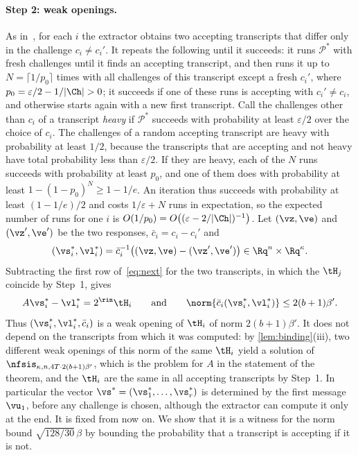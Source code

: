 \paragraph{Step 2: weak openings.}
As in~\cite{BS23,NS22}, for each $i$ the extractor obtains two accepting transcripts that differ only in the challenge $c_i\ne c_i'$. It repeats the following until it succeeds: it runs $\mathcal P^*$ with fresh challenges until it finds an accepting transcript, and then runs it up to $N=\lceil1/p_0\rceil$ times with all challenges of this transcript except a fresh $c_i'$, where $p_0=\varepsilon/2-1/\lvert\Ch\rvert>0$; it succeeds if one of these runs is accepting with $c_i'\ne c_i$, and otherwise starts again with a new first transcript. Call the challenges other than $c_i$ of a transcript \emph{heavy} if $\mathcal P^*$ succeeds with probability at least $\varepsilon/2$ over the choice of $c_i$. The challenges of a random accepting transcript are heavy with probability at least $1/2$, because the transcripts that are accepting and not heavy have total probability less than $\varepsilon/2$. If they are heavy, each of the $N$ runs succeeds with probability at least $p_0$, and one of them does with probability at least $1-(1-p_0)^N\ge1-1/e$. An iteration thus succeeds with probability at least $(1-1/e)/2$ and costs $1/\varepsilon+N$ runs in expectation, so the expected number of runs for one $i$ is $O(1/p_0)=O\bigl((\varepsilon-2/\lvert\Ch\rvert)^{-1}\bigr)$. Let $(\vz,\ve)$ and $(\vz',\ve')$ be the two responses, $\bar c_i=c_i-c_i'$ and
\[
(\vs^*_i,\vl^*_i)=\bar c_i^{-1}\bigl((\vz,\ve)-(\vz',\ve')\bigr)\in\Rq^n\times\Rq^\kappa .
\]
Subtracting the first row of~\eqref{eq:next} for the two transcripts, in which the $\tH_j$ coincide by Step~1, gives
\begin{equation}\label{eq:app-weak}
A\vs^*_i-\vl^*_i=2^{\rin}\tH_i\qquad\text{and}\qquad\norm{\bar c_i(\vs^*_i,\vl^*_i)}\le2(b+1)\beta' .
\end{equation}
Thus $(\vs^*_i,\vl^*_i,\bar c_i)$ is a weak opening of $\tH_i$ of norm $2(b+1)\beta'$. It does not depend on the transcripts from which it was computed: by \cref{lem:binding}(iii), two different weak openings of this norm of the same $\tH_i$ yield a solution of $\nfsis_{\kappa,n,4T\cdot2(b+1)\beta'}$, which is the problem for $A$ in the statement of the theorem, and the $\tH_i$ are the same in all accepting transcripts by Step~1. In particular the vector $\vs^*=(\vs^*_1,\dots,\vs^*_r)$ is determined by the first message $\vu_1$, before any challenge is chosen, although the extractor can compute it only at the end. It is fixed from now on. We show that it is a witness for the norm bound $\sqrt{128/30}\,\beta$ by bounding the probability that a transcript is accepting if it is not.

